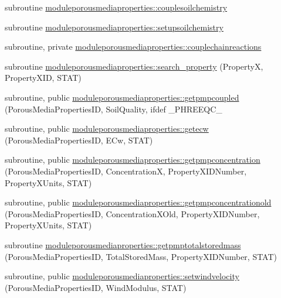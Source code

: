 \begin{DoxyCompactItemize}
subroutine \mbox{\hyperlink{namespacemoduleporousmediaproperties_aee3bf1633a5fbeea01e36455f4b4559c}{moduleporousmediaproperties\+::couplesoilchemistry}}
\item 
subroutine \mbox{\hyperlink{namespacemoduleporousmediaproperties_a3cc1f6f3ccfd4d997cac22737bc1093f}{moduleporousmediaproperties\+::setupsoilchemistry}}
\item 
subroutine, private \mbox{\hyperlink{namespacemoduleporousmediaproperties_a2d7950fe81dbe3ec4b45b30ce9e19e5c}{moduleporousmediaproperties\+::couplechainreactions}}
\item 
subroutine \mbox{\hyperlink{namespacemoduleporousmediaproperties_af477cac3aa38958d32a9af0ae317241f}{moduleporousmediaproperties\+::search\+\_\+property}} (PropertyX, Property\+X\+ID, S\+T\+AT)
\item 
subroutine, public \mbox{\hyperlink{namespacemoduleporousmediaproperties_acf31c9d94d5dc07a5b27c954a6895abb}{moduleporousmediaproperties\+::getpmpcoupled}} (Porous\+Media\+Properties\+ID, Soil\+Quality, ifdef \+\_\+\+P\+H\+R\+E\+E\+Q\+C\+\_\+
\item 
subroutine, public \mbox{\hyperlink{namespacemoduleporousmediaproperties_a24f7231dc218de6931238c8726e07bf9}{moduleporousmediaproperties\+::getecw}} (Porous\+Media\+Properties\+ID, E\+Cw, S\+T\+AT)
\item 
subroutine, public \mbox{\hyperlink{namespacemoduleporousmediaproperties_a7f77a3cf092866b51da8931bff80a9e3}{moduleporousmediaproperties\+::getpmpconcentration}} (Porous\+Media\+Properties\+ID, ConcentrationX, Property\+X\+I\+D\+Number, Property\+X\+Units, S\+T\+AT)
\item 
subroutine, public \mbox{\hyperlink{namespacemoduleporousmediaproperties_aad77475234f116fbce60ab8837dfd9e9}{moduleporousmediaproperties\+::getpmpconcentrationold}} (Porous\+Media\+Properties\+ID, Concentration\+X\+Old, Property\+X\+I\+D\+Number, Property\+X\+Units, S\+T\+AT)
\item 
subroutine \mbox{\hyperlink{namespacemoduleporousmediaproperties_a2c248d4114a4213bca448f9d77478f28}{moduleporousmediaproperties\+::getpmptotalstoredmass}} (Porous\+Media\+Properties\+ID, Total\+Stored\+Mass, Property\+X\+I\+D\+Number, S\+T\+AT)
\item 
subroutine, public \mbox{\hyperlink{namespacemoduleporousmediaproperties_a3c0d671b8b697248b218443e59bb2cb8}{moduleporousmediaproperties\+::setwindvelocity}} (Porous\+Media\+Properties\+ID, Wind\+Modulus, S\+T\+AT)
\item 

\end{DoxyCompactItemize}
